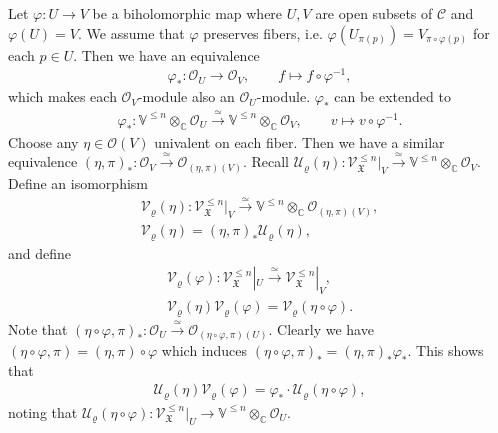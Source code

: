 \documentclass[12pt,a4paper,notitlepage]{report}
\theoremstyle{definition}
\theoremstyle{plain}
\newcommand{\fk}{\mathfrak}
\newcommand{\mc}{\mathcal}
\newcommand{\scr}{\mathscr}
\newcommand{\Vbb}{\mathbb V}
\newcommand{\Cbb}{\mathbb C}
\numberwithin{equation}{section}
\begin{document}
Let $\varphi:U\rightarrow V$ be a biholomorphic map where $U,V$ are open subsets of $\mc C$ and $\varphi(U)=V$. We assume that $\varphi$ preserves fibers, i.e. $\varphi(U_{\pi(p)})=V_{\pi\circ\varphi(p)}$ for each $p\in U$. Then we have an  equivalence
\begin{gather*}
\varphi_*:\scr O_U\rightarrow\scr O_V,\qquad f\mapsto f\circ\varphi^{-1},
\end{gather*}
which makes each $\scr O_V$-module also an $\scr O_U$-module. $\varphi_*$ can be extended to
\begin{gather*}
\varphi_*:\Vbb^{\leq n}\otimes_{\Cbb}\scr O_U\xrightarrow{\simeq}\Vbb^{\leq n}\otimes_{\Cbb}\scr O_V,\qquad v\mapsto v\circ\varphi^{-1}.
\end{gather*}
Choose any $\eta\in\scr O(V)$ univalent on each fiber. Then we have a similar equivalence $(\eta,\pi)_*:\scr O_V\xrightarrow{\simeq}\scr O_{(\eta,\pi)(V)}$. Recall $\mc U_\varrho(\eta):\scr V_{\fk X}^{\leq n}|_V\xrightarrow{\simeq}\Vbb^{\leq n}\otimes_{\Cbb}\scr O_V$. Define an isomorphism
\begin{gather}
\mc V_\varrho(\eta):\scr V_{\fk X}^{\leq n}|_V\xrightarrow{\simeq}\Vbb^{\leq n}\otimes_{\Cbb}\scr O_{(\eta,\pi)(V)},\nonumber\\
\mc V_\varrho(\eta)=(\eta,\pi)_*\mc U_\varrho(\eta),
\end{gather}
and define \index{UV@$\mc U_\varrho(\eta),\mc U_\varrho(\varphi),\mc V_\varrho(\eta),\mc V_\varrho(\varphi)$}
\begin{gather}
\mc V_\varrho(\varphi):\scr V_{\fk X}^{\leq n}|_U\xrightarrow{\simeq} \scr V_{\fk X}^{\leq n}|_V,\nonumber\\
\mc V_\varrho(\eta)\mc V_\varrho(\varphi)=\mc V_\varrho(\eta\circ\varphi).\label{eq93}
\end{gather}
Note that $(\eta\circ\varphi,\pi)_*:\scr O_U\xrightarrow{\simeq}\scr O_{(\eta\circ\varphi,\pi)(U)}$. Clearly we have $(\eta\circ\varphi,\pi)=(\eta,\pi)\circ\varphi$ which induces $(\eta\circ\varphi,\pi)_*=(\eta,\pi)_*\varphi_*$. This shows that
\begin{gather}
\mc U_\varrho(\eta)\mc V_\varrho(\varphi)=\varphi_*\cdot \mc U_\varrho(\eta\circ\varphi),\label{eq86}
\end{gather}
noting that $\mc U_\varrho(\eta\circ\varphi):\scr V_{\fk X}^{\leq n}|_U\rightarrow\Vbb^{\leq n}\otimes_{\Cbb}\scr O_U$. 
\end{document}
